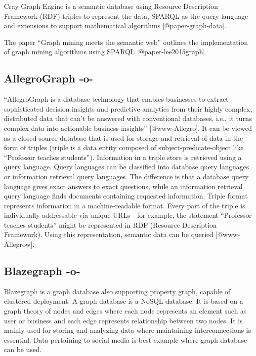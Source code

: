 Cray Graph Engine is a semantic database using Resource Description
Framework (RDF) triples to represent the data, SPARQL as the query
language and extensions to support mathematical
algorithms [@paper-graph-data].

The paper ``Graph mining meets the semantic web'' outlines the
implementation of graph mining algorithms using
SPARQL [@paper-lee2015graph].



\subsection{AllegroGraph -o-}
     
``AllegroGraph is a database technology that enables businesses to
extract sophisticated decision insights and predictive analytics from
their highly complex, distributed data that can't be answered with
conventional databases, i.e., it turns complex data into actionable
business insights'' [@www-Allegro]. It can be viewed as a closed
source database that is used for storage and retrieval of data in the
form of triples (triple is a data entity composed of
subject-predicate-object like ``Professor teaches students'').
Information in a triple store is retrieved using a query
language. Query languages can be classified into database query
languages or information retrieval query languages. The difference is
that a database query language gives exact answers to exact questions,
while an information retrieval query language finds documents
containing requested information.  Triple format represents
information in a machine-readable format.  Every part of the triple is
individually addressable via unique URLs - for example, the statement
``Professor teaches students'' might be represented in RDF (Resource
Description Framework). Using this representation, semantic data can
be queried [@www-Allegrow].



\subsection{Blazegraph -o-}

Blazegraph is a graph database also supporting property graph, capable
of clustered deployment. A graph database is a NoSQL database. It is
based on a graph theory of nodes and edges where each node represents
an element such as user or business and each edge represents
relationship between two nodes. It is mainly used for storing and
analyzing data where maintaining interconnections is essential. Data
pertaining to social media is best example where graph database can be
used.

